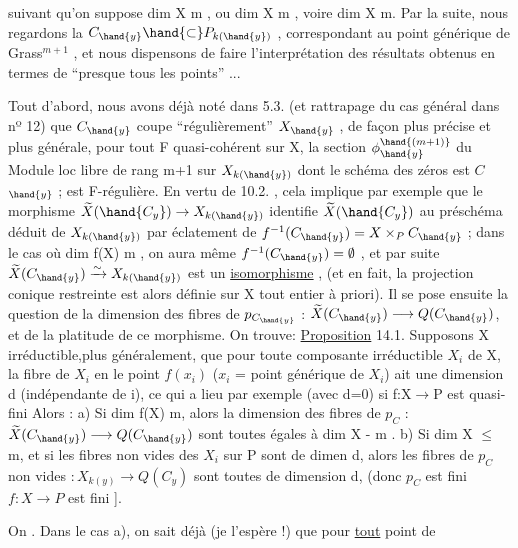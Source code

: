 
suivant qu'on suppose  dim X \hand{$\geqslant$} m , ou  dim X \hand{$\leqslant$} m , voire dim X \hand{$<$} m.
Par la suite, nous regardons la $C_{\hand{y}}\hand{\subset} P_{k(\hand{y})}$\hand{)} , correspondant au point
générique  de  Grass$^{m+1}$ , et nous dispensons  de faire l'interprétation
des résultats obtenus en termes de  ``presque tous les points'' ...

Tout d'abord, nous avons déjà noté dans 5.3. (et rattrapage du
cas général dans nº 12)  que $C_{\hand{y}}$  coupe ``régulièrement'' $X_{\hand{y}}$ , de façon
plus précise et plus générale, pour tout F quasi-cohérent sur X,
la section $\phi_{\hand{y}}^{\hand{(m+1)}}$ du Module loc libre de rang  m+1  sur  $X_{k(\hand{y})}$  dont le
schéma des zéros est $C$$_{\hand{y}}$ ; est F-régulière. En vertu de 10.2. , cela
implique par exemple que le morphisme  $\widetilde{X}(\hand{C_y})\to X_{k(\hand{y})}$ identifie $\widetilde{X}(\hand{C_y})$ au préschéma
déduit de $X_{k(\hand{y})}$ par éclatement de $f^{-1}(C_{\hand{y}})= X\times_P C_{\hand{y}}$ ;   dans le cas
où  dim f(X) \hand{$\leqslant$} m ,  on  aura même  $f^{-1}(C_{\hand{y}}) = \emptyset$ , et  par suite
$\widetilde{X}(C_{\hand{y}}) \xrightarrow{\sim} X_{k(\hand{y})}$  est un \uline{isomorphisme} , (et en fait, la \hand{\unsure{)}}projection conique
restreinte  est alors définie sur X tout entier à priori). Il se pose
ensuite la question de la dimension des fibres de $p_{C_{\hand{y}}}$ : $\widetilde{X}(C_{\hand{y}}) \longrightarrow Q(C_{\hand{y}})$,
et de la platitude de ce morphisme. On trouve:
\uline{Proposition} 14.1.   Supposons X irréductible,plus
généralement, que  pour toute composante irréductible $X_i$ de X, la fibre
de $X_i$ en le point $f(x_i)$  ($x_i$ = point générique de $X_i$) ait une dimension d
(indépendante de i), ce qui a lieu par exemple (avec d=0) si f:X$\to$P est quasi-fini\hand{,} \placedmargin{}
Alors :     a)  Si  dim f(X) \hand{$>$} m, alors la dimension  des fibres de
$p_C$  : $\widetilde{X}(C_{\hand{y}}) \longrightarrow Q(C_{\hand{y}})$  sont toutes égales à  dim X - m .   b)  Si dim X
$\leqslant$ m, et si les fibres non vides des $X_i$ sur P sont  de dimen d, alors les fibres de $p_C$ non vides $\colon X_{k(y)}\to Q(C_y)$ sont toutes de dimension d,  (donc $p_C$ est fini   $f\colon X\to P$ est fini ].

On 
. Dans le cas a), 
  on sait déjà (je l'espère !) que pour \uline{tout}  point  de


